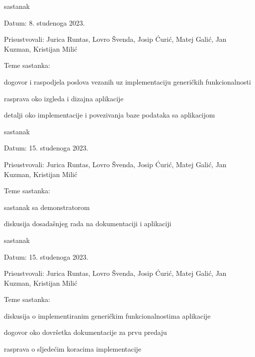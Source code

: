 \begin{packed_enum}
			\item sastanak
			\item[] \begin{packed_item}
			\item Datum: 8. studenoga 2023.
			\item Prisustvovali: Jurica Runtas, Lovro Švenda, Josip Ćurić,
			Matej Galić, Jan Kuzman, Kristijan Milić
			\item Teme sastanka:
			\begin{packed_item}
				\item dogovor i raspodjela poslova vezanih uz implementaciju generičkih funkcionalnosti
				\item rasprava oko izgleda i dizajna aplikacije
				\item detalji oko implementacije i povezivanja baze podataka sa aplikacijom
			\end{packed_item}
			\end{packed_item}
		
			\item sastanak
			\item[] \begin{packed_item}
			\item Datum: 15. studenoga 2023.
			\item Prisustvovali: Jurica Runtas, Lovro Švenda, Josip Ćurić,
			Matej Galić, Jan Kuzman, Kristijan Milić
			\item Teme sastanka:
			\begin{packed_item}
				\item sastanak sa demonstratorom
				\item diskusija dosadašnjeg rada na dokumentaciji i aplikaciji
			\end{packed_item}
			\end{packed_item}
		
			\item sastanak
			\item[] \begin{packed_item}
			\item Datum: 15. studenoga 2023.
			\item Prisustvovali: Jurica Runtas, Lovro Švenda, Josip Ćurić,
			Matej Galić, Jan Kuzman, Kristijan Milić
			\item Teme sastanka:
			\begin{packed_item}
				\item diskusija o implementiranim generičkim funkcionalnostima aplikacije
				\item dogovor oko dovršetka dokumentacije za prvu predaju
				\item rasprava o sljedećim koracima implementacije
			\end{packed_item}
			\end{packed_item}
		

\end{packed_enum}
